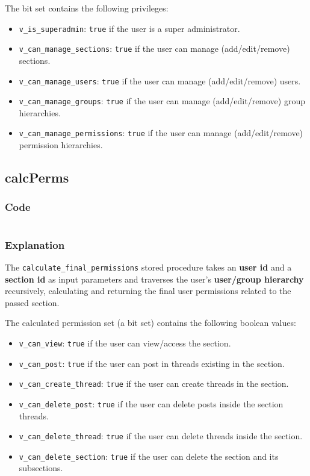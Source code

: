 \documentclass[12pt]{report}
\renewcommand\emph{\textbf}
\newcommand{\printSQLtest}[1]
{
    \inputminted[linenos, breaklines, breakbytoken, tabsize=4, fontsize=\footnotesize]{mysql}{#1}
}
\newcommand{\printSQLTablepage}[2]
{    
    \subsection{#2}
    \subsubsection{Code}
    \printSQLtest{../sql/parts/#1}
    \subsubsection{Explanation}
}
\begin{document}
                    The bit set contains the following privileges:

                    \begin{itemize}
                        \item \texttt{v_is_superadmin}: \texttt{true} if the user is a super administrator.
                        \item \texttt{v_can_manage_sections}: \texttt{true} if the user can manage (add/edit/remove) sections.
                        \item \texttt{v_can_manage_users}: \texttt{true} if the user can manage (add/edit/remove) users.
                        \item \texttt{v_can_manage_groups}: \texttt{true} if the user can manage (add/edit/remove) group hierarchies.
                        \item \texttt{v_can_manage_permissions}: \texttt{true} if the user can manage (add/edit/remove) permission hierarchies.
                    \end{itemize}

                \newpage

                \printSQLTablepage{29_procCalcPerms.sql}{calcPerms}
                    The \texttt{calculate_final_permissions} stored procedure takes an \emph{user id} and a \emph{section id} as input parameters and traverses the user's \emph{user/group hierarchy} recursively, calculating and returning the final user permissions related to the passed section.

                    The calculated permission set (a bit set) contains the following boolean values:

                    \begin{itemize}
                        \item \texttt{v_can_view}: \texttt{true} if the user can view/access the section.
                        \item \texttt{v_can_post}: \texttt{true} if the user can post in threads existing in the section.
                        \item \texttt{v_can_create_thread}: \texttt{true} if the user can create threads in the section.
                        \item \texttt{v_can_delete_post}: \texttt{true} if the user can delete posts inside the section threads.
                        \item \texttt{v_can_delete_thread}: \texttt{true} if the user can delete threads inside the section.
                        \item \texttt{v_can_delete_section}: \texttt{true} if the user can delete the section and its subsections.
                    \end{itemize}
\end{document}
